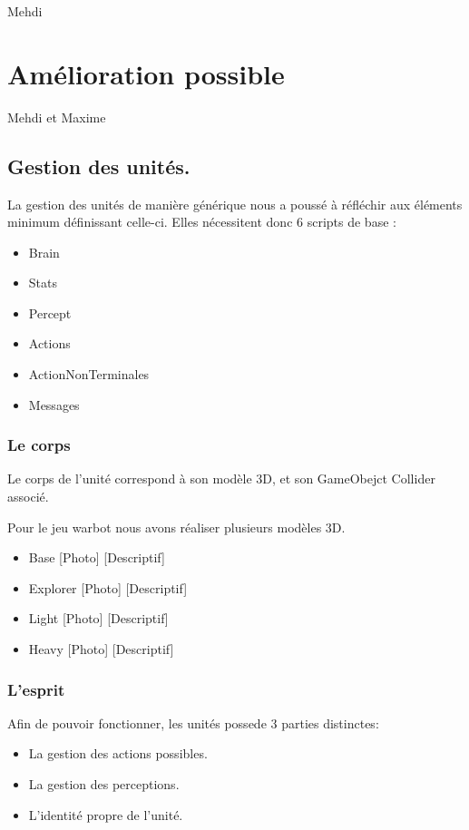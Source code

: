 \documentclass{report}
\begin{document}
Mehdi

\section{Amélioration possible}
Mehdi et Maxime
\subsection{Gestion des unités.}

La gestion des unités de manière générique nous a poussé à réfléchir aux éléments minimum définissant celle-ci.
Elles nécessitent donc 6 scripts de base : 
\begin{itemize}
\item Brain
\item Stats
\item Percept
\item Actions
\item ActionNonTerminales
\item Messages
\end{itemize}

\subsubsection{Le corps}

Le corps de l'unité correspond à son modèle 3D, et son GameObejct Collider associé.

Pour le jeu warbot nous avons réaliser plusieurs modèles 3D.
\begin{itemize}
\item Base
[Photo]
[Descriptif]
\item Explorer
[Photo]
[Descriptif]
\item Light
[Photo]
[Descriptif]
\item Heavy
[Photo]
[Descriptif]
\end{itemize}

\subsubsection{L'esprit}
Afin de pouvoir fonctionner, les unités possede 3 parties distinctes: 
\begin{itemize}
\item La gestion des actions possibles.
\item La gestion des perceptions.
\item L'identité propre de l'unité.
\end{itemize}
\end{document}
